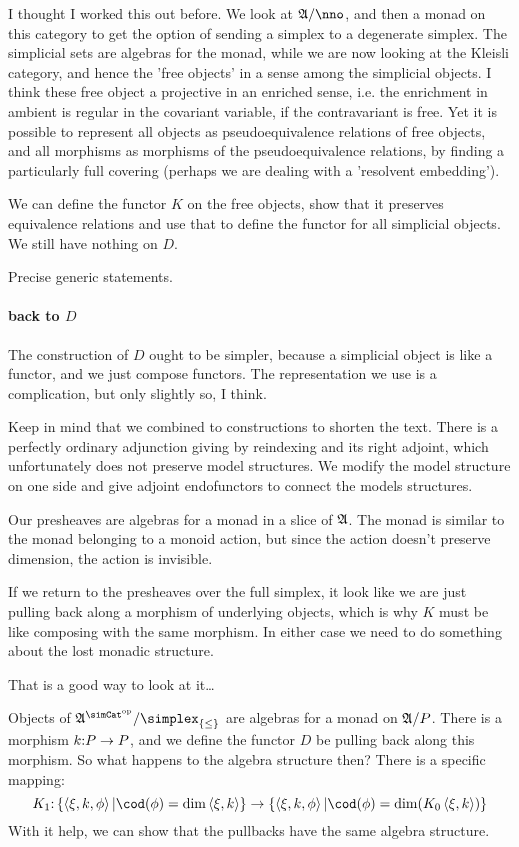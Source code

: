 \documentclass[csh.tex]{subfiles}
\begin{document}
I thought I worked this out before. We look at $\ambient/\nno$, and then a monad on this category to get the option of sending a simplex to a degenerate simplex. The simplicial sets are algebras for the monad, while we are now looking at the Kleisli category, and hence the 'free objects' in a sense among the simplicial objects. I think these free object a projective in an enriched sense, i.e. the enrichment in ambient is regular in the covariant variable, if the contravariant is free. Yet it is possible to represent all objects as pseudoequivalence relations of free objects, and all morphisms as morphisms of the pseudoequivalence relations, by finding a particularly full covering (perhaps we are dealing with a 'resolvent embedding').

We can define the functor $K$ on the free objects, show that it preserves equivalence relations and use that to define the functor for all simplicial objects.
We still have nothing on $D$.

Precise generic statements.

\paragraph{back to $D$}
The construction of $D$ ought to be simpler, because a simplicial object is like a functor, and we just compose functors.
The representation we use is a complication, but only slightly so, I think.

Keep in mind that we combined to constructions to shorten the text. There is a perfectly ordinary adjunction giving by reindexing and its right adjoint, which unfortunately does not preserve model structures. We modify the model structure on one side and give adjoint endofunctors to connect the models structures.

Our presheaves are algebras for a monad in a slice of $\mathfrak A$. The monad is similar to the monad belonging to a monoid action, but since the action doesn't preserve dimension, the action is invisible.

If we return to the presheaves over the full simplex, it look like we are just pulling back along a morphism of underlying objects, which is why $K$ must be like composing with the same morphism. In either case we need to do something about the lost monadic structure.

That is a good way to look at it\dots

Objects of $\ambient\s/\simplex_{\set\leq}$ are algebras for a monad on $\mathfrak A/P$. There is a morphism $k\mathord : P\to P$, and we define the functor $D$ be pulling back along this morphism. So what happens to the algebra structure then? There is a specific mapping:
\[ K_1\of \set{ \tuplet{\xi,k,\phi} | \cod(\phi)=\dim\tuplet{\xi,k} } \to \set{ \tuplet{\xi,k,\phi} | \cod(\phi) = \dim(K_0\tuplet{\xi,k}) } \]
With it help, we can show that the pullbacks have the same algebra structure.
\end{document}
